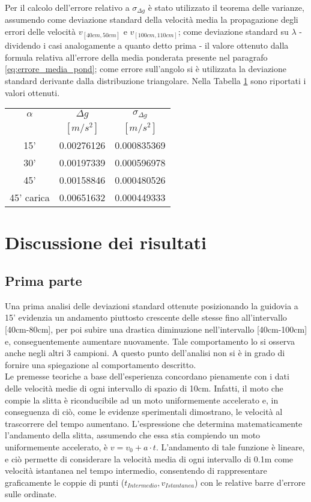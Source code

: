 \documentclass[a4paper,11pt,oneside]{article}
\begin{document}
Per il calcolo dell'errore relativo a $\sigma_{\Delta g}$ è stato utilizzato il teorema delle varianze, assumendo come deviazione standard della velocità media la propagazione degli errori delle velocità  $v_{[40cm,50cm]}$ e $v_{[100cm,110cm]}$; come deviazione standard su $\lambda$ - dividendo i casi analogamente a quanto detto prima - il valore ottenuto dalla formula relativa all'errore della media ponderata presente nel paragrafo \ref{eq:errore_media_pond}; come errore sull'angolo si è utilizzata la deviazione standard derivante dalla distribuzione triangolare. Nella Tabella \ref{tab:delta_g} sono riportati i valori ottenuti.

\begin{table}[h!]
    \centering
    \begin{tabular}{c|c|c}
        \toprule
        $\alpha$ & $\Delta g$ & $\sigma_{\Delta g}$ \\
        &$[\si{m/s^2}]$&$[\si{m/s^2}]$\\
        
    \midrule
    15' &0.00276126 & 0.000835369 \\ 
    30' & 0.00197339 & 0.000596978 \\
    45' & 0.00158846 & 0.000480526 \\
    45' carica & 0.00651632 & 0.000449333 \\
 \bottomrule
    \end{tabular}
    \label{tab:delta_g}
\end{table}

\section{Discussione dei risultati}
\subsection{Prima parte}
Una prima analisi delle deviazioni standard ottenute posizionando la guidovia a 15' evidenzia un andamento piuttosto crescente delle stesse fino all'intervallo [40cm-80cm], per poi subire una drastica diminuzione nell'intervallo [40cm-100cm] e, conseguentemente aumentare nuovamente. Tale comportamento lo si osserva anche negli altri 3 campioni. A questo punto dell'analisi non si è in grado di fornire una spiegazione al comportamento descritto.\\

Le premesse teoriche a base dell'esperienza concordano pienamente con i dati delle velocità medie di ogni intervallo di spazio di 10\si{cm}. Infatti, il moto che compie la slitta è riconducibile ad un moto uniformemente accelerato e, in conseguenza di ciò, come le evidenze sperimentali dimostrano, le velocità al trascorrere del tempo aumentano. L'espressione che determina matematicamente l'andamento della slitta, assumendo che essa stia compiendo un moto uniformemente accelerato, è $v=v_{0}+a\cdot t$. L'andamento di tale funzione è lineare, e ciò permette di considerare la velocità media di ogni intervallo di 0.1\si{m} come velocità istantanea nel tempo intermedio, consentendo di rappresentare graficamente le coppie di punti ($t_{Intermedio}, v_{Istantanea}$) con  le relative barre d'errore sulle ordinate.\\
\end{document}
